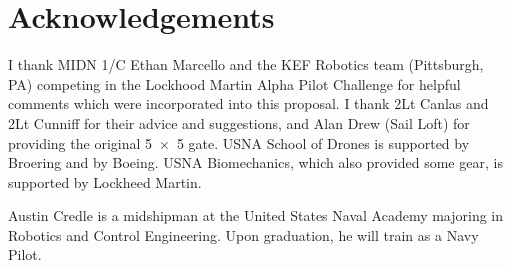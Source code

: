 \documentclass[onecolumn,10pt]{IEEEtran}
\newcommand{\myroot}{../}
\begin{document}
\section*{Acknowledgements}
I thank MIDN 1/C Ethan Marcello and the KEF Robotics team (Pittsburgh, PA) competing in the Lockhood Martin Alpha Pilot Challenge for helpful comments which were incorporated into this proposal. I thank 2Lt Canlas and 2Lt Cunniff for their advice and suggestions, and Alan Drew (Sail Loft) for providing the original \SI{5x5}{\foot} gate. USNA School of Drones is supported by Broering and by Boeing.  USNA Biomechanics, which also provided some gear, is supported by Lockheed Martin. 




\begin{IEEEbiography}{Austin Credle} is a midshipman at the United States Naval Academy majoring in Robotics and Control Engineering. Upon graduation, he will train as a Navy Pilot. 
\end{IEEEbiography}
%

%
\end{document}
